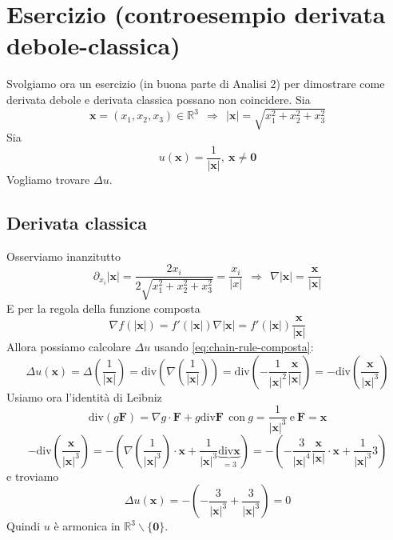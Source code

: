 \documentclass[10pt,a4paper,twoside,openright]{book}
\newcommand{\x}{\mathbf{x}}
\newcommand{\zer}{\mathbf{0}}
\begin{document}
\section{Esercizio (controesempio derivata debole-classica)}
\label{sec:controesempio-derivata-debole-classica}

Svolgiamo ora un esercizio (in buona parte di Analisi 2) per dimostrare come derivata debole e derivata classica possano non coincidere. Sia
\begin{equation*}
	\x =( x_{1} ,x_{2} ,x_{3}) \in \mathbb{R}^{3} \ \ \Rightarrow \ \ | \x| =\sqrt{x^{2}_{1} +x^{2}_{2} +x^{2}_{3}}
\end{equation*}
Sia 
\begin{equation*}
	u(\x) =\frac{1}{| \x| } ,\ \x \neq \zer
\end{equation*}
Vogliamo trovare $\displaystyle \Delta u$.

\subsection{Derivata classica}

Osserviamo inanzitutto 
\begin{equation*}
	\partial _{x_{i}}| \x| =\frac{2x_{i}}{2\sqrt{x_{1}^{2} +x_{2}^{2} +x_{3}^{2}}} =\frac{x_{i}}{| x| } \ \ \Rightarrow \ \ \nabla | \x| =\frac{\x}{| \x| }
\end{equation*}
E per la regola della funzione composta
\begin{equation}
	\nabla f(| \x| ) =f'(| \x| ) \nabla | \x| =f'(| \x| )\frac{\x}{| \x| }
	\label{eq:chain-rule-composta}
\end{equation}
Allora possiamo calcolare $\displaystyle \Delta u$ usando \eqref{eq:chain-rule-composta}:
\begin{equation*}
	\Delta u(\x) =\Delta \left(\frac{1}{| \x| }\right) =\mathrm{div}\left( \nabla \left(\frac{1}{| \x| }\right)\right) =\mathrm{div}\left( -\frac{1}{| \x| ^{2}}\frac{\x}{| \x| }\right) =-\mathrm{div}\left(\frac{\x}{| \x| ^{3}}\right)
\end{equation*}
Usiamo ora l'identità di Leibniz 
\begin{equation*}
	\mathrm{div}( g\mathbf{F}) =\nabla g\cdotp \mathbf{F} +g\mathrm{div}\mathbf{F} \ \ \text{con} \ g=\frac{1}{| \x| ^{3}} \ \text{e} \ \mathbf{F} =\x
\end{equation*}
\begin{equation*}
	-\mathrm{div}\left(\frac{\x}{| \x| ^{3}}\right) =-\left( \nabla \left(\frac{1}{| \x| ^{3}}\right) \cdotp \x +\frac{1}{| \x| ^{3}}\underbrace{\mathrm{div}\x}_{=3}\right) =-\left( -\frac{3}{| \x| ^{4}}\frac{\x}{| \x| } \cdotp \x +\frac{1}{| \x| ^{3}} 3\right)
\end{equation*}
e troviamo
\begin{equation*}
	\Delta u(\x) =-\left( -\frac{3}{| \x| ^{3}} +\frac{3}{| \x| ^{3}}\right) =0
\end{equation*}
Quindi $\displaystyle u$ è armonica in $\displaystyle \mathbb{R}^{3} \backslash \{\zer\}$.
\end{document}
